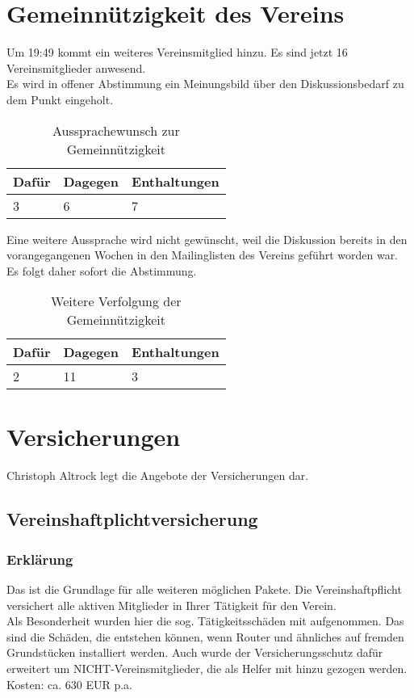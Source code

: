 \documentclass[a4paper]{scrartcl}
\begin{document}
\section{Gemeinnützigkeit des Vereins}
Um 19:49 kommt ein weiteres Vereinsmitglied hinzu. Es sind jetzt 16 Vereinsmitglieder anwesend.\\
Es wird in offener Abstimmung ein Meinungsbild über den Diskussionsbedarf zu dem Punkt eingeholt.\\
\begin{table}[h]
	\begin{tabularx}{\textwidth}{XXX}
		Dafür & Dagegen & Enthaltungen\\
		\toprule
		3 & 6 & 7\\
	\end{tabularx}
	\caption{Aussprachewunsch zur Gemeinnützigkeit}
\end{table}
Eine weitere Aussprache wird nicht gewünscht, weil die Diskussion bereits in den vorangegangenen Wochen in den Mailinglisten des Vereins geführt worden war. Es folgt daher sofort die Abstimmung.\\
\begin{table}[h]
	\begin{tabularx}{\textwidth}{XXX}
		Dafür & Dagegen & Enthaltungen\\
		\toprule
		2 & 11 & 3\\
	\end{tabularx}
	\caption{Weitere Verfolgung der Gemeinnützigkeit}
\end{table}

\section{Versicherungen}
Christoph Altrock legt die Angebote der Versicherungen dar.
\subsection{Vereinshaftplichtversicherung}
\subsubsection{Erklärung}
Das ist die Grundlage für alle weiteren möglichen Pakete. Die Vereinshaftpflicht versichert alle aktiven Mitglieder in Ihrer Tätigkeit für den Verein.\\
Als Besonderheit wurden hier die sog. Tätigkeitsschäden mit aufgenommen. Das sind die Schäden, die entstehen können, wenn Router und ähnliches auf fremden Grundstücken installiert werden. Auch wurde der Versicherungsschutz dafür erweitert um NICHT-Vereinsmitglieder, die als Helfer mit hinzu gezogen werden.\\
Kosten: ca. 630 EUR p.a.
\end{document}
